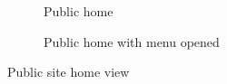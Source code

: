 \documentclass{report}
\begin{document}
\begin{figure}[H]
\begin{subfigure}{.5\textwidth}
  \caption{Public home}
  \label{fig:sub1}
\end{subfigure}%
\begin{subfigure}{.5\textwidth}
  \centering
  \caption{Public home with menu opened}
  \label{fig:sub2}
\end{subfigure}
\caption{Public site home view}
\label{fig:test}
\end{figure}
\end{document}
